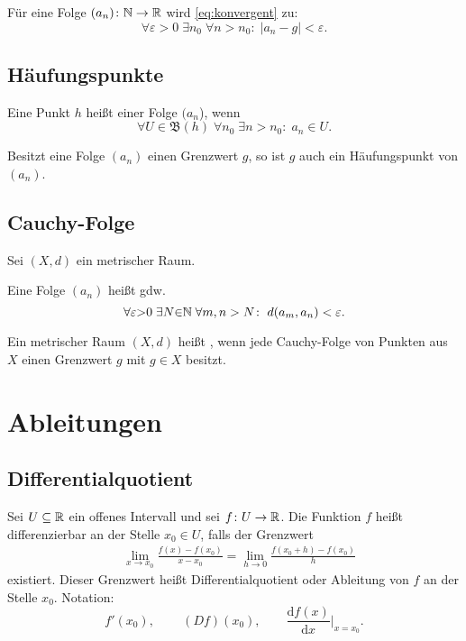 Für eine Folge $(a_n)\colon\mathbb N\to\mathbb R$ wird \eqref{eq:konvergent} zu:
\begin{equation}
\forall\varepsilon{>}0\;\exists n_0\;\forall n{>}n_0\colon\;
|a_n-g|<\varepsilon.
\end{equation}

\subsection{Häufungspunkte}
\begin{Definition}
Eine Punkt $h$ heißt  einer Folge $(a_n$), wenn
\begin{equation}
\forall U{\in}\mathfrak B(h)\;\forall n_0\;\exists n{>}n_0\colon\;
a_n\in U.
\end{equation}
\end{Definition}
\noindent
Besitzt eine Folge $(a_n)$ einen Grenzwert $g$, so ist $g$ auch ein
Häufungspunkt von $(a_n)$.

\subsection{Cauchy-Folge}
Sei $(X,d)$ ein metrischer Raum.
\begin{Definition}
Eine Folge $(a_n)$ heißt 
gdw.
\begin{equation}
\forall\varepsilon{>}0\;\exists N{\in}\mathbb N\;\forall m,n>N\colon\;
d(a_m,a_n)<\varepsilon.
\end{equation}
\end{Definition}
\noindent
Ein metrischer Raum $(X,d)$ heißt , wenn jede
Cauchy-Folge von Punkten aus $X$ einen Grenzwert $g$ mit $g\in X$
besitzt.

\section{Ableitungen}
\subsection{Differentialquotient}
Sei $U\subseteq\mathbb R$ ein offenes Intervall
und sei $f\colon U\to\mathbb R$. Die Funktion $f$ heißt
differenzierbar
an der Stelle $x_0\in U$, falls der Grenzwert
\begin{equation}
\begin{split}
&\lim_{x\to x_0} \frac{f(x)-f(x_0)}{x-x_0}
= \lim_{h\to 0}\frac{f(x_0+h)-f(x_0)}{h}
\end{split}
\end{equation}
existiert. Dieser Grenzwert heißt
Differentialquotient oder Ableitung
von $f$ an der Stelle $x_0$. Notation:
\begin{equation}
f'(x_0),\,\qquad (Df)(x_0),\qquad \frac{\mathrm df(x)}{\mathrm dx}\Big|_{x=x_0}.
\end{equation}

